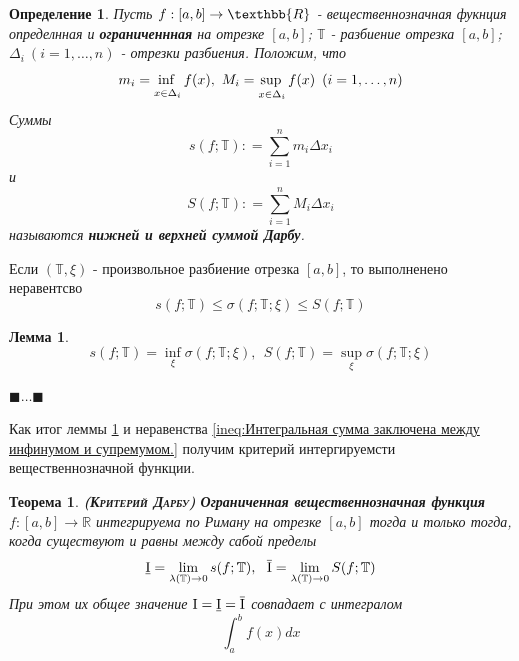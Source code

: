 \documentclass[a4paper,14pt]{article} %
\newtheorem{theorem}{Теорема}
\newtheorem{lemma}{Лемма}
\newtheorem{definition}{Определение}
\begin{document}
    \begin{definition}
         Пусть \( f : [a,b] \rightarrow \texthbb{R} \) - вещественнозначная фукнция определнная и \textbf{ограниченнная} на отрезке \([a,b]\)\textnormal{;} $\mathbb{T}$ - разбиение отрезка \([a,b]\)\textnormal{;} \(\Delta_i \ (i = 1,\dots,n)\) - отрезки разбиения. Положим, что 
         \[ 
        m_i = \adjustlimits \inf_{x \in \Delta_i}{f(x)}, \ M_i = \adjustlimits \sup_{x \in \Delta_i}{f(x)} \ (i = 1,\dots,n)
         \]
        Суммы 
        \[
        s(f;\mathbb{T}) \mathrel{\mathop:}= \sum_{i=1}^{n}{m_i\Delta x_i}
        \]
        и
        \[
        S(f;\mathbb{T}) \mathrel{\mathop:}= \sum_{i=1}^{n}{M_i\Delta x_i}
        \]
        называются \textbf{нижней и верхней суммой Дарбу}.
    \end{definition}
    
    Если \( (\mathbb{T}, \xi) \) - произвольное разбиение отрезка \( [a,b] \), то выполненено неравентсво
    \begin{equation}\label{ineq:Интегральная сумма заключена между инфинумом и супремумом.}
        s(f;\mathbb{T}) \leqslant \sigma(f;\mathbb{T};\xi) \leqslant S(f;\mathbb{T})
    \end{equation}
    
    \begin{lemma}\label{eq:lemma1}
    \[
    s(f;\mathbb{T}) = \inf_{\xi}{\sigma(f;\mathbb{T};\xi)}, \ \  S(f;\mathbb{T}) = \sup_{\xi}{\sigma(f;\mathbb{T};\xi)}
    \]
    \end{lemma}
    \(\blacksquare \dots \blacksquare\) 
    
    Как итог леммы \ref{eq:lemma1} и неравенства \eqref{ineq:Интегральная сумма заключена между инфинумом и супремумом.} получим критерий интергируемсти вещественнозначной функции.
    
    \begin{theorem}
    \textbf{\textsc{(Критерий Дарбу)}} \textbf{Ограниченная вещественнозначная функция} $f : [a,b] \rightarrow \mathbb{R}$ интегрируема по Риману на отрезке $[a,b]$ тогда и только тогда, когда существуют и равны между сабой пределы 
    \begin{equation}
    \underline{\textnormal{I}} = \lim_{\lambda(\mathbb{T}) \rightarrow 0}{s(f;\mathbb{T})}, \ \ \overline{\textnormal{I}} = \lim_{\lambda(\mathbb{T}) \rightarrow 0}{S(f;\mathbb{T})}    
    \end{equation}
    При этом их общее значение $\textnormal{I} = \underline{\textnormal{I}} = \overline{\textnormal{I}}$ совпадает с интегралом 
    \[
    \int_{a}^{b}{f(x)dx}
    \]
    \end{theorem}
    
\end{document}
